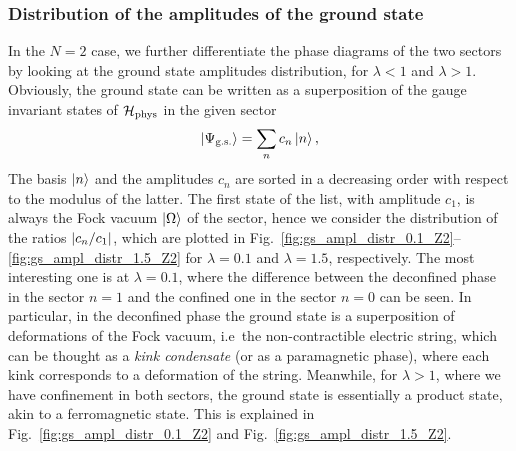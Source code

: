 \subsubsection{Distribution of the amplitudes of the ground state}
\label{ssub:amplitudes_distribution}

In the $N=2$ case, we further differentiate the phase diagrams of the two sectors by looking at the ground state amplitudes distribution, for $\lambda<1$ and $\lambda>1$.
Obviously, the ground state can be written as a superposition of the gauge invariant states of $\mathcal{H}_{\text{phys}}$ in the given sector
\begin{equation}
    \ket{\Psi_{\text{g.s.} }}= \sum_n c_n \ket{n},
    \label{eq:gs_amplitudes}
\end{equation}
The basis $\ket{n}$ and the amplitudes $c_n$ are sorted in a decreasing order with respect to the modulus of the latter.
The first state of the list, with amplitude $c_1$, is always the Fock vacuum $\ket{\Omega}$ of the sector, hence we consider the distribution of the ratios $\abs{c_n / c_1}$, which are plotted in Fig.~\ref{fig:gs_ampl_distr_0.1_Z2}--\ref{fig:gs_ampl_distr_1.5_Z2} for $\lambda=0.1$ and $\lambda=1.5$, respectively.
The most interesting one is at $\lambda = 0.1$, where the difference between the deconfined phase in the sector $n=1$ and the confined one in the sector $n=0$ can be seen.
In particular, in the deconfined phase the ground state is a superposition of deformations of the Fock vacuum, i.e~the non-contractible electric string, which can be thought as a \emph{kink condensate} \cite{fradkin1978order} (or as a paramagnetic phase), where each kink corresponds to a deformation of the string.
Meanwhile, for $\lambda > 1$, where we have confinement in both sectors, the ground state is essentially a product state, akin to a ferromagnetic state.
This is explained in Fig.~\ref{fig:gs_ampl_distr_0.1_Z2} and Fig.~\ref{fig:gs_ampl_distr_1.5_Z2}.



